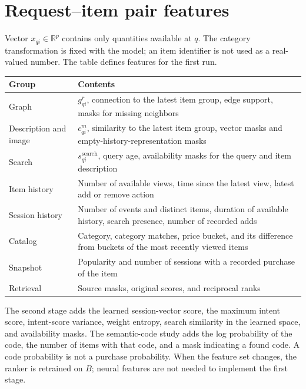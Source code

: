 \documentclass[12pt,a4paper]{article}
\newcommand{\R}{\mathbb R}
\theoremstyle{plainru}
\begin{document}
\section{Request--item pair features}\label{sec:model-features}

Vector $x_{qi}\in\R^p$ contains only quantities available at $q$.
The category transformation is fixed with the model;
an item identifier is not used as a real-valued number.
The table defines features for the first run.

{\small
\begin{longtable}{p{}p{}}
\toprule
Group & Contents \\
\midrule
Graph & $g^r_{qi}$, connection to the latest item group, edge support,
masks for missing neighbors \\
Description and image & $c^m_{qi}$, similarity to the latest item group,
vector masks and empty-history-representation masks \\
Search & $s_{qi}^{\mathrm{search}}$, query age,
availability masks for the query and item description \\
Item history & Number of available views, time since the latest
view, latest add or remove action \\
Session history & Number of events and distinct items, duration
of available history, search presence, number of recorded adds \\
Catalog & Category, category matches, price bucket,
and its difference from buckets of the most recently viewed items \\
Snapshot & Popularity and number of sessions with a recorded purchase of the item \\
Retrieval & Source masks, original scores, and reciprocal ranks \\
\bottomrule
\end{longtable}}

The second stage adds the learned session-vector score,
the maximum intent score, intent-score variance, weight entropy,
search similarity in the learned space, and availability masks.
The semantic-code study adds the log probability
of the code, the number of items with that code, and a mask indicating a found code.
A code probability is not a purchase probability.
When the feature set changes, the ranker is retrained on \(B\);
neural features are not needed to implement the first stage.
\end{document}
